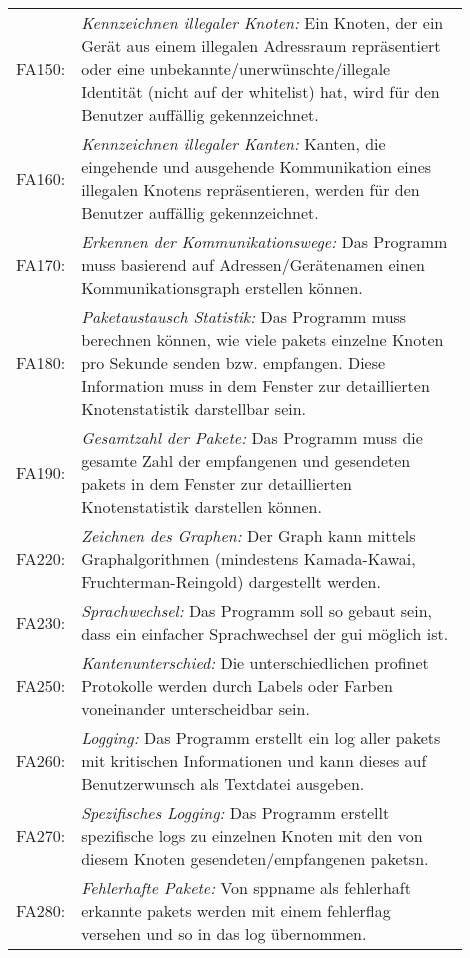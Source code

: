 \begin{longtable}{lp{0.9\linewidth}}
FA150: & \textit{Kennzeichnen illegaler Knoten: }Ein Knoten, der ein Gerät aus einem illegalen Adressraum repräsentiert oder eine unbekannte/unerwünschte/illegale Identität (nicht auf der \gls{whitelist}) hat, wird für den Benutzer auffällig gekennzeichnet. \\

FA160: & \textit{Kennzeichnen illegaler Kanten: }Kanten, die eingehende und ausgehende Kommunikation eines illegalen Knotens repräsentieren, werden für den Benutzer auffällig gekennzeichnet. \\

FA170: & \textit{Erkennen der Kommunikationswege: }Das Programm muss basierend auf Adressen/Gerätenamen einen Kommunikationsgraph erstellen können. \\

FA180: & \textit{Paketaustausch Statistik: }Das Programm muss berechnen können, wie viele \glspl{paket} einzelne Knoten pro Sekunde senden bzw. empfangen. Diese Information muss in dem Fenster zur detaillierten Knotenstatistik darstellbar sein. \\

FA190: & \textit{Gesamtzahl der Pakete: }Das Programm muss die gesamte Zahl der empfangenen und gesendeten \glspl{paket} in dem Fenster zur detaillierten Knotenstatistik darstellen können. \\

FA220: & \textit{Zeichnen des Graphen: }Der Graph kann mittels Graphalgorithmen (mindestens Kamada-Kawai, Fruchterman-Reingold) dargestellt werden. \\

FA230: & \textit{Sprachwechsel: }Das Programm soll so gebaut sein, dass ein einfacher Sprachwechsel der \gls{gui} möglich ist. \\

FA250: & \textit{Kantenunterschied: }Die unterschiedlichen \gls{profinet} Protokolle werden durch Labels oder Farben voneinander unterscheidbar sein. \\

FA260: & \textit{Logging: }Das Programm erstellt ein \gls{log} aller \glspl{paket} mit kritischen Informationen und kann dieses auf Benutzerwunsch als Textdatei ausgeben. \\

FA270: & \textit{Spezifisches Logging: }Das Programm erstellt spezifische \glspl{log} zu einzelnen Knoten mit den von diesem Knoten gesendeten/empfangenen \glspl{paket}n. \\

FA280: & \textit{Fehlerhafte Pakete: }Von \gls{sppname} als fehlerhaft erkannte \glspl{paket} werden mit einem \gls{fehlerflag} versehen und so in das \gls{log} übernommen.

\end{longtable}


